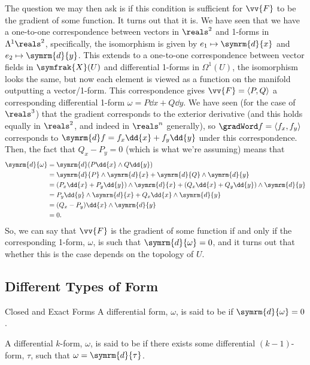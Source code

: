 \documentclass[fleqn]{NotesClass}
\renewcommand{\dl}{\symrm{d}}
\newcommand{\vectorFields}{\symfrak{X}}
\begin{document}
    The question we may then ask is if this condition is sufficient for \(\vv{F}\) to be the gradient of some function.
    It turns out that it is.
    We have seen that we have a one-to-one correspondence between vectors in \(\reals^2\) and 1-forms in \(\Lambda^1\reals^2\), specifically, the isomorphism is given by \(e_1 \mapsto \dl{x}\) and \(e_2 \mapsto \dl{y}\).
    This extends to a one-to-one correspondence between vector fields in \(\vectorFields(U)\) and differential 1-forms in \(\Omega^1(U)\), the isomorphism looks the same, but now each element is viewed as a function on the manifold outputting a vector/1-form.
    This correspondence gives \(\vv{F} = \langle P, Q\rangle\) a corresponding differential 1-form \(\omega = P \dd{x} + Q \dd{y}\).
    We have seen (for the case of \(\reals^3\)) that the gradient corresponds to the exterior derivative (and this holds equally in \(\reals^2\), and indeed in \(\reals^n\) generally), so \(\gradWord f = \langle f_x, f_y \rangle\) corresponds to \(\dl f = f_x \dd{x} + f_y \dd{y}\) under this correspondence.
    Then, the fact that \(Q_x - P_y = 0\) (which is what we're assuming) means that
    \begin{align}
        \dl{\omega} &= \dl(P \dd{x} \wedge Q \dd{y})\\
        &= \dl{P} \wedge \dl{x} + \dl{Q} \wedge \dl{y}\\
        &= (P_x \dd{x} + P_y \dd{y}) \wedge \dl{x} + (Q_x \dd{x} + Q_y \dd{y}) \wedge \dl{y}\\
        &= P_y \dd{y} \wedge \dl{x} + Q_x \dd{x} \wedge \dl{y}\\
        &= (Q_x - P_y) \dd{x} \wedge \dl{y}\\
        &= 0.
    \end{align}
    So, we can say that \(\vv{F}\) is the gradient of some function if and only if the corresponding 1-form, \(\omega\), is such that \(\dl{\omega} = 0\), and it turns out that whether this is the case depends on the topology of \(U\).
    
    \subsection{Different Types of Form}
    \begin{dfn}{Closed and Exact Forms}{}
        A differential form, \(\omega\), is said to be  if \(\dl{\omega} = 0\).
        
        A differential \(k\)-form, \(\omega\), is said to be  if there exists some differential \((k - 1)\)-form, \(\tau\), such that \(\omega = \dl{\tau}\).
    \end{dfn}
    
\end{document}
